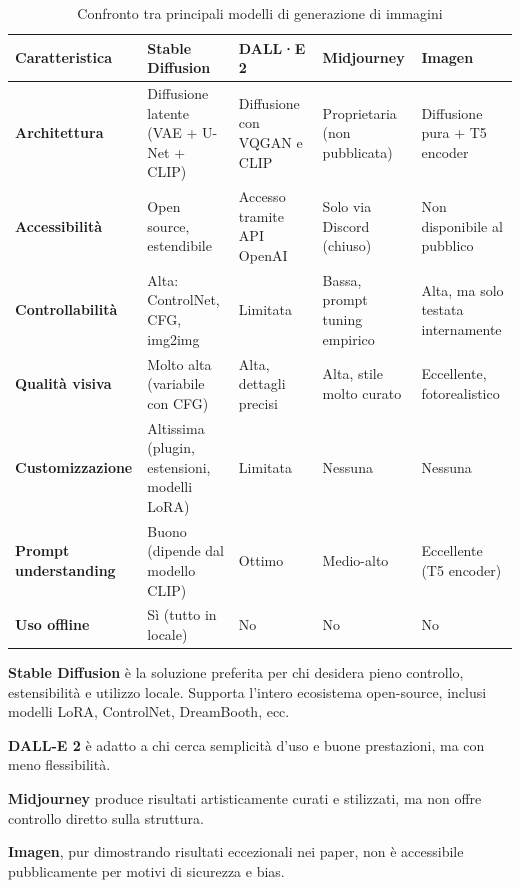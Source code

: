 \begin{table}
    \centering
    \caption{Confronto tra principali modelli di generazione di immagini}
    \begin{tabularx}{\textwidth}{|l|X|X|X|X|}
    \hline
    \textbf{Caratteristica} & \textbf{Stable Diffusion} & \textbf{DALL·E 2} & \textbf{Midjourney} & \textbf{Imagen} \\
    \hline
    \textbf{Architettura} & Diffusione latente (VAE + U-Net + CLIP) & Diffusione con VQGAN e CLIP & Proprietaria (non pubblicata) & Diffusione pura + T5 encoder \\
    \hline
    \textbf{Accessibilità} & Open source, estendibile & Accesso tramite API OpenAI & Solo via Discord (chiuso) & Non disponibile al pubblico \\
    \hline
    \textbf{Controllabilità} & Alta: ControlNet, CFG, img2img & Limitata & Bassa, prompt tuning empirico & Alta, ma solo testata internamente \\
    \hline
    \textbf{Qualità visiva} & Molto alta (variabile con CFG) & Alta, dettagli precisi & Alta, stile molto curato & Eccellente, fotorealistico \\
    \hline
    \textbf{Customizzazione} & Altissima (plugin, estensioni, modelli LoRA) & Limitata & Nessuna & Nessuna \\
    \hline
    \textbf{Prompt understanding} & Buono (dipende dal modello CLIP) & Ottimo & Medio-alto & Eccellente (T5 encoder) \\
    \hline
    \textbf{Uso offline} & Sì (tutto in locale) & No & No & No \\
    \hline
\end{tabularx}
\end{table}


\begin{Osservazione}
    \textbf{Stable Diffusion} è la soluzione preferita per chi desidera pieno controllo, estensibilità e utilizzo locale. Supporta l’intero ecosistema open-source, inclusi modelli LoRA, ControlNet, DreamBooth, ecc.
\end{Osservazione}
\begin{Osservazione}
    \textbf{DALL-E 2} è adatto a chi cerca semplicità d’uso e buone prestazioni, ma con meno flessibilità.
\end{Osservazione}
\begin{Osservazione}
    \textbf{Midjourney} produce risultati artisticamente curati e stilizzati, ma non offre controllo diretto sulla struttura.
\end{Osservazione}
\begin{Osservazione}
    \textbf{Imagen}, pur dimostrando risultati eccezionali nei paper, non è accessibile pubblicamente per motivi di sicurezza e bias.
\end{Osservazione}

